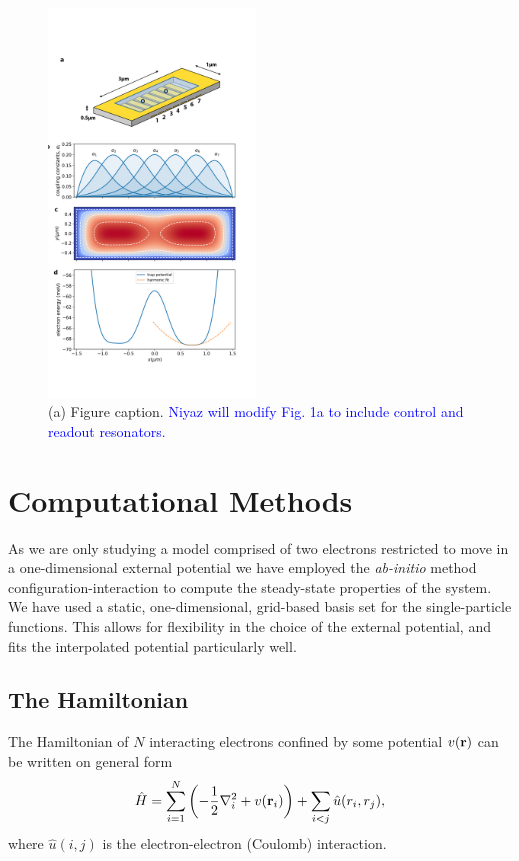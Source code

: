 \documentclass[twocolumn,superscriptaddress,unsortedaddress,
 amsmath,amssymb,
 aps,
]{revtex4-2}
\begin{document}
\begin{figure}
\includegraphics[width=0.49\textwidth]{figure1.png}
\caption{\label{fig3} (a) Figure caption. \textcolor{blue}{Niyaz will modify Fig. 1a to include control and readout resonators.}}
\end{figure}

\section{Computational Methods} %
    As we are only studying a model comprised of two electrons restricted to move in a
    one-dimensional external potential we have employed the
    \emph{ab-initio} method configuration-interaction to compute the steady-state
    properties of the system.
    We have used a static, one-dimensional, grid-based basis set for the single-particle
    functions.
    This allows for flexibility in the choice of the external potential, and fits the
    interpolated potential particularly well.
    
    \subsection{The Hamiltonian}
    The Hamiltonian of $N$ interacting electrons confined by some potential $v(\vb{r})$ can be written on general form 
    \begin{equation}
        \hat{H} = \sum_{i=1}^N \left(-\frac{1}{2}\nabla_i^2 + v(\vb{r}_i) \right) + \sum_{i < j} \hat{u}(r_i, r_j),
    \end{equation}
    where $\hat{u}(i,j)$ is the electron-electron (Coulomb) interaction. 
    
\end{document}
